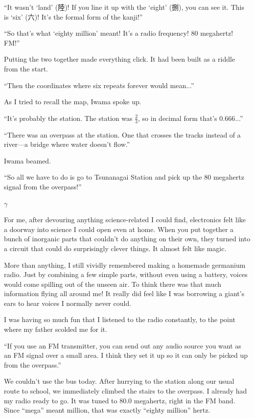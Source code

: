 \documentclass[
    a4paper,
    12pt,
    twoside,
    openany,
    UTF8,
    fontset=windows
]{ctexbook}
\begin{document}
``It wasn't `land' (陸)! If you line it up with the `eight' (捌), you can see it. This is `six' (六)! It's the formal form of the kanji!''

``So that's what `eighty million' meant! It's a radio frequency! 80 megahertz! FM!''

Putting the two together made everything click. It had been built as a riddle from the start.

``Then the coordinates where six repeats forever would mean...''

As I tried to recall the map, Iwama spoke up.

``It's probably the station. The station was $\frac{2}{3}$, so in decimal form that's $0.666$...''

``There was an overpass at the station. One that crosses the tracks instead of a river---a bridge where water doesn't flow.''

Iwama beamed.

``So all we have to do is go to Tsunanagai Station and pick up the 80 megahertz signal from the overpass!''

$\gamma$

For me, after devouring anything science-related I could find, electronics felt like a doorway into science I could open even at home. When you put together a bunch of inorganic parts that couldn't do anything on their own, they turned into a circuit that could do surprisingly clever things. It almost felt like magic.

More than anything, I still vividly remembered making a homemade germanium radio. Just by combining a few simple parts, without even using a battery, voices would come spilling out of the unseen air. To think there was that much information flying all around me! It really did feel like I was borrowing a giant's ears to hear voices I normally never could.

I was having so much fun that I listened to the radio constantly, to the point where my father scolded me for it.

``If you use an FM transmitter, you can send out any audio source you want as an FM signal over a small area. I think they set it up so it can only be picked up from the overpass.''

We couldn't use the bus today. After hurrying to the station along our usual route to school, we immediately climbed the stairs to the overpass. I already had my radio ready to go. It was tuned to 80.0 megahertz, right in the FM band. Since ``mega'' meant million, that was exactly ``eighty million'' hertz.
\end{document}
